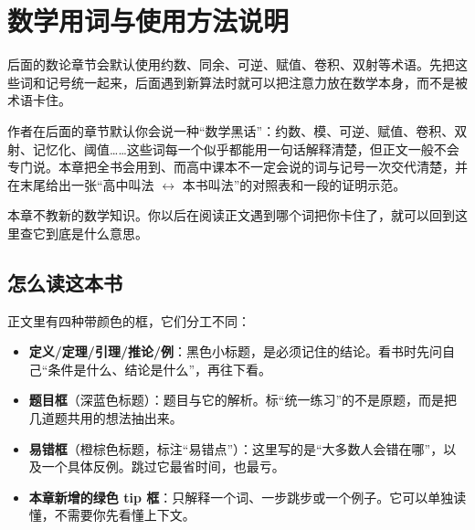 \documentclass[UTF8,a4paper,11pt,twoside,openright,fontset=fandol]{ctexbook}
\theoremstyle{definition}
\begin{document}


\tableofcontents
\mainmatter
\setcounter{chapter}{-1}
\chapter{数学用词与使用方法说明}
\begin{chapterintro}[章节导读]
后面的数论章节会默认使用约数、同余、可逆、赋值、卷积、双射等术语。先把这些词和记号统一起来，后面遇到新算法时就可以把注意力放在数学本身，而不是被术语卡住。
\end{chapterintro}

\begin{tip}[这一章解决什么问题]
作者在后面的章节默认你会说一种“数学黑话”：约数、模、可逆、赋值、卷积、双射、记忆化、阈值……这些词每一个似乎都能用一句话解释清楚，但正文一般不会专门说。本章把全书会用到、而高中课本不一定会说的词与记号一次交代清楚，并在末尾给出一张“高中叫法 $\leftrightarrow$ 本书叫法”的对照表和一段的证明示范。

本章不教新的数学知识。你以后在阅读正文遇到哪个词把你卡住了，就可以回到这里查它到底是什么意思。
\end{tip}

\section{怎么读这本书}


正文里有四种带颜色的框，它们分工不同：

\begin{itemize}
\item \textbf{定义/定理/引理/推论/例}：黑色小标题，是必须记住的结论。看书时先问自己“条件是什么、结论是什么”，再往下看。
\item \textbf{题目框}（深蓝色标题）：题目与它的解析。标“统一练习”的不是原题，而是把几道题共用的想法抽出来。
\item \textbf{易错框}（橙棕色标题，标注“易错点”）：这里写的是“大多数人会错在哪”，以及一个具体反例。跳过它最省时间，也最亏。
\item \textbf{本章新增的绿色 tip 框}：只解释一个词、一步跳步或一个例子。它可以单独读懂，不需要你先看懂上下文。
\end{itemize}
\end{document}
